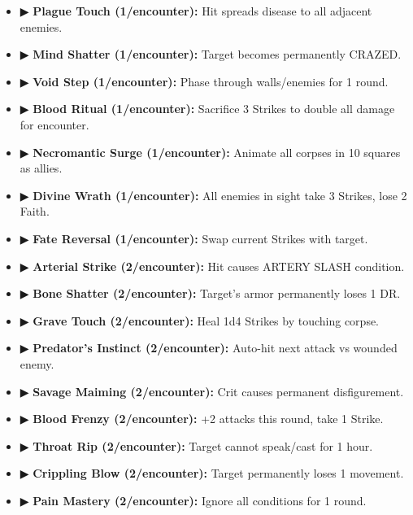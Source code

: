 \documentclass[10pt,twoside]{article}
\begin{document}
\begin{multicols}{2}
{\begin{itemize}
\item ▶ \textbf{Plague Touch (1/encounter):} Hit spreads disease to all adjacent enemies.

\item ▶ \textbf{Mind Shatter (1/encounter):} Target becomes permanently CRAZED.

\item ▶ \textbf{Void Step (1/encounter):} Phase through walls/enemies for 1 round.

\item ▶ \textbf{Blood Ritual (1/encounter):} Sacrifice 3 Strikes to double all damage for encounter.

\item ▶ \textbf{Necromantic Surge (1/encounter):} Animate all corpses in 10 squares as allies.

\item ▶ \textbf{Divine Wrath (1/encounter):} All enemies in sight take 3 Strikes, lose 2 Faith.

\item ▶ \textbf{Fate Reversal (1/encounter):} Swap current Strikes with target.

\item ▶ \textbf{Arterial Strike (2/encounter):} Hit causes ARTERY SLASH condition.

\item ▶ \textbf{Bone Shatter (2/encounter):} Target's armor permanently loses 1 DR.

\item ▶ \textbf{Grave Touch (2/encounter):} Heal 1d4 Strikes by touching corpse.

\item ▶ \textbf{Predator's Instinct (2/encounter):} Auto-hit next attack vs wounded enemy.

\item ▶ \textbf{Savage Maiming (2/encounter):} Crit causes permanent disfigurement.

\item ▶ \textbf{Blood Frenzy (2/encounter):} +2 attacks this round, take 1 Strike.

\item ▶ \textbf{Throat Rip (2/encounter):} Target cannot speak/cast for 1 hour.

\item ▶ \textbf{Crippling Blow (2/encounter):} Target permanently loses 1 movement.

\item ▶ \textbf{Pain Mastery (2/encounter):} Ignore all conditions for 1 round.


\end{itemize}}
\end{multicols}
\end{document}

